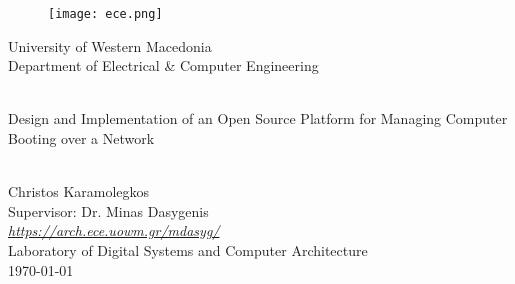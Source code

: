 \begin{titlepage}
	\setcounter{page}{3}
	\begin{center}
		\begin{figure}[h]
			\centering \texttt{[image: ece.png]}
		\end{figure}
		{\LARGE University of Western Macedonia\\}
		{\Large Department of Electrical \& Computer Engineering}

		\begin{center}
			\vspace{2cm}
			\HRule \\[0.4cm]
			{\huge Design and Implementation of an Open Source Platform for Managing Computer Booting over a Network\\}
			\HRule \\[0.4cm]
		\end{center}

		\vfill
		\begin{doublespacing}
			{\LARGE Christos Karamolegkos\\}
			{\Large Supervisor: Dr. Minas Dasygenis\\}
			{\Large \href{https://arch.ece.uowm.gr/mdasyg/}{\textit{https://arch.ece.uowm.gr/mdasyg/}}\\}
			{\Large Laboratory of Digital Systems and Computer Architecture\\}
			\vfill
			{\Large \today}
		\end{doublespacing}
	\end{center}
	\newpage
	\thispagestyle{empty}
	\mbox{}
\end{titlepage}









\newpage\tableofcontents

\listoffigures
\clearpage


\listoftables
\clearpage


